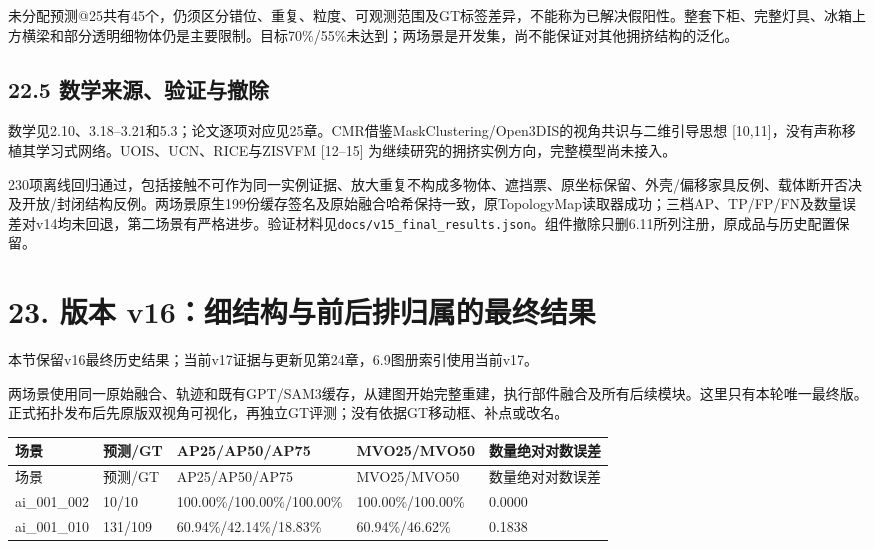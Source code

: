 \documentclass[UTF8,fontset=fandol]{ctexart}
\begin{document}
未分配预测@25共有45个，仍须区分错位、重复、粒度、可观测范围及GT标签差异，不能称为已解决假阳性。整套下柜、完整灯具、冰箱上方横梁和部分透明细物体仍是主要限制。目标70\%/55\%未达到；两场景是开发集，尚不能保证对其他拥挤结构的泛化。



\subsection*{22.5 数学来源、验证与撤除}

数学见2.10、3.18–3.21和5.3；论文逐项对应见25章。CMR借鉴MaskClustering/Open3DIS的视角共识与二维引导思想 [10,11]，没有声称移植其学习式网络。UOIS、UCN、RICE与ZISVFM [12–15] 为继续研究的拥挤实例方向，完整模型尚未接入。



230项离线回归通过，包括接触不可作为同一实例证据、放大重复不构成多物体、遮挡票、原坐标保留、外壳/偏移家具反例、载体断开否决及开放/封闭结构反例。两场景原生199份缓存签名及原始融合哈希保持一致，原TopologyMap读取器成功；三档AP、TP/FP/FN及数量误差对v14均未回退，第二场景有严格进步。验证材料见\texttt{docs/\allowbreak{}v15\_\allowbreak{}final\_\allowbreak{}results.\allowbreak{}json}。组件撤除只删6.11所列注册，原成品与历史配置保留。



\section*{23. 版本 v16：细结构与前后排归属的最终结果}

本节保留v16最终历史结果；当前v17证据与更新见第24章，6.9图册索引使用当前v17。



两场景使用同一原始融合、轨迹和既有GPT/SAM3缓存，从建图开始完整重建，执行部件融合及所有后续模块。这里只有本轮唯一最终版。正式拓扑发布后先原版双视角可视化，再独立GT评测；没有依据GT移动框、补点或改名。



{\small
\begin{longtable}{|p{}|p{}|p{}|p{}|p{}|}
\hline
场景 & 预测/GT & AP25/AP50/AP75 & MVO25/MVO50 & 数量绝对对数误差 \\ \hline
\endfirsthead
\hline
场景 & 预测/GT & AP25/AP50/AP75 & MVO25/MVO50 & 数量绝对对数误差 \\ \hline
\endhead
ai\_001\_002 & 10/10 & 100.00\%/100.00\%/100.00\% & 100.00\%/100.00\% & 0.0000 \\ \hline
ai\_001\_010 & 131/109 & 60.94\%/42.14\%/18.83\% & 60.94\%/46.62\% & 0.1838 \\ \hline
\end{longtable}
}
\end{document}
